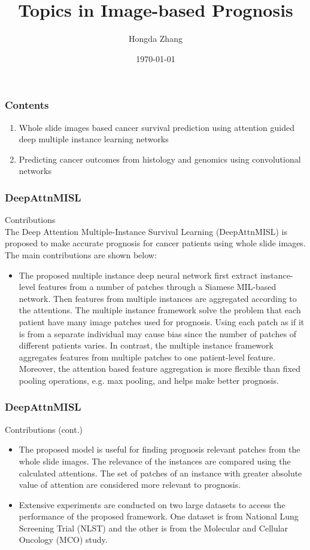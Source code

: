 \documentclass{beamer}
\title[]{Topics in Image-based Prognosis}
\author[Hongda Zhang]{Hongda Zhang}
\institute{Nanjing University}
\date{\today}
\begin{document}
	\begin{frame}
		\titlepage
	\end{frame}
	
	\begin{frame}
		\frametitle{Contents}
		\begin{enumerate}
			\item Whole slide images based cancer survival prediction using attention guided deep multiple instance learning networks
			\item Predicting cancer outcomes from histology and genomics using convolutional networks
		\end{enumerate}
		\nocite{*}
	\end{frame}
	
	\begin{frame}
		\frametitle{DeepAttnMISL}
		Contributions \\
		\vspace{5mm}
		The Deep Attention Multiple-Instance Survival Learning (DeepAttnMISL) is proposed to make accurate prognosis for cancer patients using whole slide images. The main contributions are shown below:
		\begin{itemize}
			\item The proposed multiple instance deep neural network first extract instance-level features from a number of patches through a Siamese MIL-based network. Then features from multiple instances are aggregated according to the attentions. The multiple instance framework solve the problem that each patient have many image patches used for prognosis. Using each patch as if it is from a separate individual may cause bias since the number of patches of different patients varies. In contrast, the multiple instance framework aggregates features from multiple patches to one patient-level feature. Moreover, the attention based feature aggregation is more flexible than fixed pooling operations, e.g. max pooling, and helps make better prognosis. 
		\end{itemize}
	\end{frame}
	
	\begin{frame}
		\frametitle{DeepAttnMISL}
		Contributions (cont.) 
		\begin{itemize}
			\item The proposed model is useful for finding prognosis relevant patches from the whole slide images. The relevance of the instances are compared using the calculated attentions. The set of patches of an instance with greater absolute value of attention are considered more relevant to prognosis.
			\item Extensive experiments are conducted on two large datasets to access the performance of the proposed framework. One dataset is from National Lung Screening Trial (NLST) and the other is from the Molecular and Cellular Oncology (MCO) study.
		\end{itemize}
	\end{frame}
\end{document}

